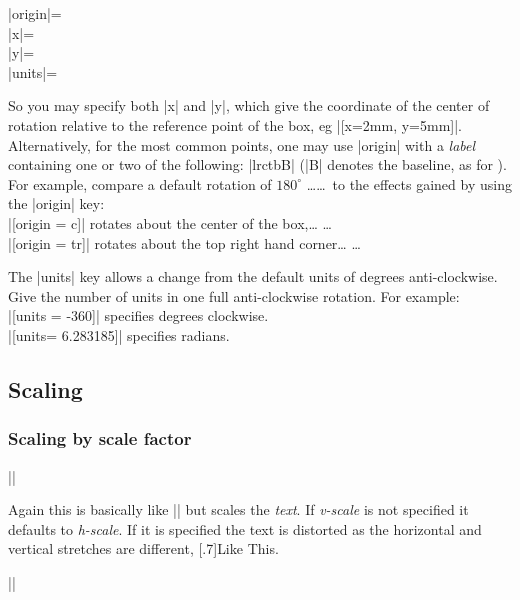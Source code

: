 \begin{decl}
|origin|=\\
|x|=\\
|y|=\\
|units|=
\end{decl}

So you may specify both |x| and |y|, which give the coordinate of
the center of rotation relative to the reference point of the box, eg
|[x=2mm, y=5mm]|. Alternatively, for the most common points, one may use
|origin| with a \emph{label} containing one or two of the following:
|lrctbB| (|B| denotes the baseline, as for ). For
example, compare a default rotation of $180^\circ$
\ldots{}\ldots\ to the effects gained by using
the |origin| key:\\
|[origin = c]| rotates about the center of the box,\ldots
         \ldots\\
|[origin = tr]| rotates about the top right hand corner\ldots
                   \ldots

The |units| key allows a change from the default units of degrees
anti-clockwise. Give the number of units in one full anti-clockwise
rotation. For example:\\
|[units = -360]| specifies degrees clockwise.\\
|[units= 6.283185]| specifies radians.

\subsection{Scaling}

\subsubsection{Scaling by scale factor}

\begin{decl}
|\scalebox|
\end{decl}

Again this is basically like |\mbox| but scales the \emph{text}.
If \emph{v-scale} is not specified it defaults to \emph{h-scale}.
If it is specified the text is distorted as the horizontal and
vertical stretches are different, \scalebox{3}[.7]{Like This}.


\begin{decl}
||
\end{decl}

